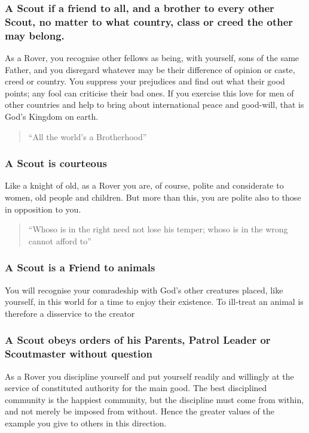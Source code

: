 \documentclass[11pt]{article}
\begin{document}
\subsubsection{A Scout if a friend to all, and a brother to every other Scout, no matter to what country, class or creed the other may belong.}
As a Rover, you recognise other fellows as being, with yourself, sons of the same Father, and you disregard whatever may be their difference of opinion or caste, creed or country. You suppress your prejudices and find out what their good points; any fool can criticise their bad ones. If you exercise this love for men of other countries and help to bring about international peace and good-will, that is God's Kingdom on earth.

\begin{quote}
  ``All the world's a Brotherhood''
\end{quote}

\subsubsection{A Scout is courteous}
Like a knight of old, as a Rover you are, of course, polite and considerate to women, old people and children. But more than this, you are polite also to those in opposition to you.

\begin{quote}
  ``Whoso is in the right need not lose his temper; whoso is in the wrong cannot afford to''
\end{quote}
  
\subsubsection{A Scout is a Friend to animals}
You will recognise your comradeship with God's other creatures placed, like yourself, in this world for a time to enjoy their existence. To ill-treat an animal is therefore a disservice to the creator

\subsubsection{A Scout obeys orders of his Parents, Patrol Leader or Scoutmaster without question}
As a Rover you discipline yourself and put yourself readily and willingly at the service of constituted authority for the main good. The best disciplined community is the happiest community, but the discipline must come from within, and not merely be imposed from without. Hence the greater values of the example you give to others in this direction.
 
\end{document}
